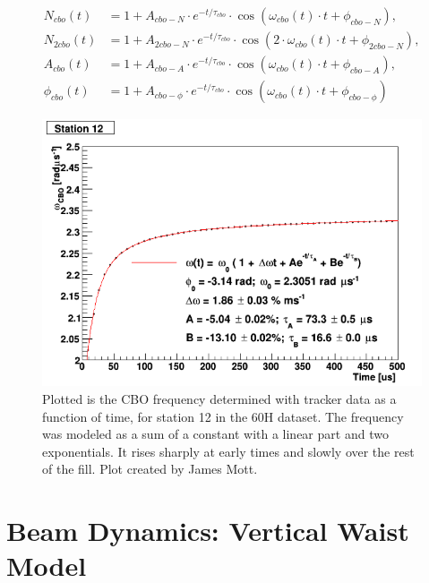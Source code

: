 \begin{enumerate}
{			\begin{equation}	
			\begin{aligned}
					N_{cbo}(t) &= 1 + A_{cbo-N} \cdot e^{-t/\tau_{cbo}} \cdot \cos(\omega_{cbo}(t) \cdot t + \phi_{cbo-N}), \\
					N_{2cbo}(t) &= 1 + A_{2cbo-N} \cdot e^{-t/\tau_{cbo}} \cdot \cos(2 \cdot \omega_{cbo}(t) \cdot t + \phi_{2cbo-N}), \\
					A_{cbo}(t) &= 1 + A_{cbo-A} \cdot e^{-t/\tau_{cbo}} \cdot \cos(\omega_{cbo}(t) \cdot t + \phi_{cbo-A}), \\
					\phi_{cbo}(t) &= 1 + A_{cbo-\phi} \cdot e^{-t/\tau_{cbo}} \cdot \cos(\omega_{cbo}(t) \cdot t + \phi_{cbo-\phi})
			\label{eqn:CBO}
			\end{aligned}
			\end{equation}
		}
	\end{enumerate}

	\begin{figure}[]
		\centering
		\includegraphics[width=\textwidth]{TrackerCBOModel}
	    \caption[TrackerCBOModel]{Plotted is the CBO frequency determined with tracker data as a function of time, for station 12 in the 60H dataset. The frequency was modeled as a sum of a constant with a linear part and two exponentials. It rises sharply at early times and slowly over the rest of the fill. Plot created by James Mott.}
	    \label{fig:TrackerCBOModel}
	\end{figure}


\section{Beam Dynamics: Vertical Waist Model}
\label{Sec:VW}

